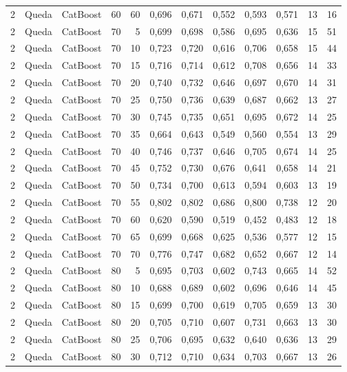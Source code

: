 \begin{longtable}{@{}rllrrrrrrrrr@{}}
2 & Queda & CatBoost & 60 & 60 & 0,696 & 0,671 & 0,552 & 0,593 & 0,571 & 13 & 16 \\
2 & Queda & CatBoost & 70 & 5 & 0,699 & 0,698 & 0,586 & 0,695 & 0,636 & 15 & 51 \\
2 & Queda & CatBoost & 70 & 10 & 0,723 & 0,720 & 0,616 & 0,706 & 0,658 & 15 & 44 \\
2 & Queda & CatBoost & 70 & 15 & 0,716 & 0,714 & 0,612 & 0,708 & 0,656 & 14 & 33 \\
2 & Queda & CatBoost & 70 & 20 & 0,740 & 0,732 & 0,646 & 0,697 & 0,670 & 14 & 31 \\
2 & Queda & CatBoost & 70 & 25 & 0,750 & 0,736 & 0,639 & 0,687 & 0,662 & 13 & 27 \\
2 & Queda & CatBoost & 70 & 30 & 0,745 & 0,735 & 0,651 & 0,695 & 0,672 & 14 & 25 \\
2 & Queda & CatBoost & 70 & 35 & 0,664 & 0,643 & 0,549 & 0,560 & 0,554 & 13 & 29 \\
2 & Queda & CatBoost & 70 & 40 & 0,746 & 0,737 & 0,646 & 0,705 & 0,674 & 14 & 25 \\
2 & Queda & CatBoost & 70 & 45 & 0,752 & 0,730 & 0,676 & 0,641 & 0,658 & 14 & 21 \\
2 & Queda & CatBoost & 70 & 50 & 0,734 & 0,700 & 0,613 & 0,594 & 0,603 & 13 & 19 \\
2 & Queda & CatBoost & 70 & 55 & 0,802 & 0,802 & 0,686 & 0,800 & 0,738 & 12 & 20 \\
2 & Queda & CatBoost & 70 & 60 & 0,620 & 0,590 & 0,519 & 0,452 & 0,483 & 12 & 18 \\
2 & Queda & CatBoost & 70 & 65 & 0,699 & 0,668 & 0,625 & 0,536 & 0,577 & 12 & 15 \\
2 & Queda & CatBoost & 70 & 70 & 0,776 & 0,747 & 0,682 & 0,652 & 0,667 & 12 & 14 \\
2 & Queda & CatBoost & 80 & 5 & 0,695 & 0,703 & 0,602 & 0,743 & 0,665 & 14 & 52 \\
2 & Queda & CatBoost & 80 & 10 & 0,688 & 0,689 & 0,602 & 0,696 & 0,646 & 14 & 45 \\
2 & Queda & CatBoost & 80 & 15 & 0,699 & 0,700 & 0,619 & 0,705 & 0,659 & 13 & 30 \\
2 & Queda & CatBoost & 80 & 20 & 0,705 & 0,710 & 0,607 & 0,731 & 0,663 & 13 & 30 \\
2 & Queda & CatBoost & 80 & 25 & 0,706 & 0,695 & 0,632 & 0,640 & 0,636 & 13 & 29 \\
2 & Queda & CatBoost & 80 & 30 & 0,712 & 0,710 & 0,634 & 0,703 & 0,667 & 13 & 26 \\

\end{longtable}
